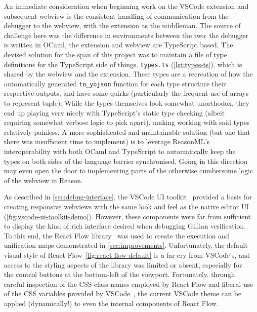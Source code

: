 An immediate consideration when beginning work on the VSCode extension and
subsequent webview is the consistent handling of communication from the debugger
to the webview, with the extension as the middleman. The source of challenge
here was the difference in environments between the two; the debugger is written
in OCaml, the extension and webview are TypeScript based. The devised solution
for the span of this project was to maintain a file of type definitions for the
TypeScript side of things, \texttt{types.ts} (\autoref{lst:types-ts}), which is
shared by the webview and the extension. These types are a recreation of how the
automatically generated \texttt{to\_yojson} function for each type structure
their respective outputs, and have some quirks (particularly the frequent use
of arrays to represent tuple). While the types themselves look somewhat
unorthodox, they end up playing very nicely with TypeScript's static type
checking (albeit requiring somewhat verbose logic to pick apart), making working
with said types relatively painless. A more sophisticated and maintainable
solution (but one that there was insufficient time to implement) is to leverage
ReasonML's~\cite{reason-ml} interoperability with both OCaml and TypeScript to
automatically keep the types on both sides of the language barrier synchronised.
Going in this direction may even open the door to implementing parts of the
otherwise cumbersome logic of the webview in Reason.

As described in \autoref{sec:debug-interface}, the VSCode UI
toolkit~\cite{vscode-ui-toolkit} provided a basis for creating responsive
webviews with the same look and feel as the native editor UI
(\autoref{fig:vscode-ui-toolkit-demo}). However, these components were far from
sufficient to display the kind of rich interface desired when debugging Gillian
verification. To this end, the React Flow library~\cite{react-flow} was used
to create the execution and unification maps demonstrated in
\autoref{sec:improvements}. Unfortunately, the default visual style of React
Flow~\autoref{fig:react-flow-default} is a far cry from VSCode's, and access
to the styling aspects of the library was limited or absent, especially for the
control buttons at the bottom-left of the viewport. Fortunately, through careful
inspection of the CSS class names employed by React Flow and liberal use of the
CSS variables provided by VSCode~\cite{vscode-theme}, the current VSCode theme
can be applied (dynamically!) to even the internal components of React Flow.

